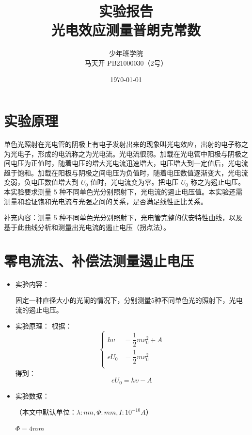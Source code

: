 \documentclass[a4paper]{ltxdoc}
\title {实验报告\\光电效应测量普朗克常数}
\author {少年班学院\\马天开 PB21000030（2号）}
\date {\today}
\newenvironment{Figure}
  {\par\medskip\noindent\minipage{\linewidth}}
  {\endminipage\par\medskip}
\begin{document}
\begin{multicols}{2}
    \maketitle
    \section{实验原理}
    单色光照射在光电管的阴极上有电子发射出来的现象叫光电效应，出射的电子称之为光电子，形成的电流称之为光电流。光电流很弱。加载在光电管中阳极与阴极之间电压为正值时，随着电压的增大光电流迅速增大，电压增大到一定值后，光电流趋于饱和。加载在阳极与阴极之间电压为负值时，随着电压数值逐渐变大，光电流变弱，负电压数值增大到 $U_0$ 值时，光电流变为零。把电压 $U_0$ 称之为遏止电压。本实验要求测量 5 种不同单色光分别照射下，光电流的遏止电压值。本实验还需测量和验证饱和光电流与光强之间的关系，是否满足线性正比关系。

    补充内容：测量 5 种不同单色光分别照射下，光电管完整的伏安特性曲线，以及基于此曲线分析和测量出光电流的遏止电压（拐点法）。

    \section{零电流法、补偿法测量遏止电压}
    \begin{itemize}
        \item 实验内容：

              固定一种直径大小的光阑的情况下，分别测量5种不同单色光的照射下，光电流的遏止电压。

        \item 实验原理：
              根据：
              $$
                  \left\{
                  \begin{aligned}
                      h \upsilon & = \dfrac 1 2 m v_{0}^2 + A \\
                      eU_0       & = \dfrac 1 2 m v_0^2       \\
                  \end{aligned}
                  \right.
              $$
              得到：
              \begin{equation}
                  eU_0 = h\upsilon - A
              \end{equation}
        \item 实验数据：


              （本文中默认单位：$\lambda: nm,\Phi: mm,I: 10^{-10} A$）
              \bigskip
              \begin{Figure}
                  \centering
                  $\Phi = 4 mm$


\end{Figure}
\end{itemize}
\end{multicols}
\end{document}
